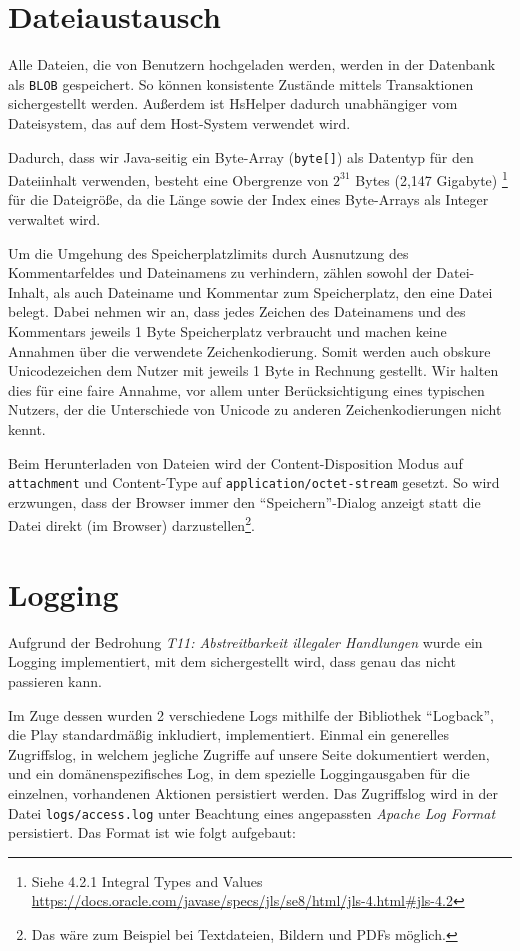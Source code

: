 \documentclass[12pt,DIV14,BCOR10mm,a4paper,parskip=half-,headsepline,headinclude,english,ngerman,bibliography=totocnumbered]{scrreprt}
\begin{document}
\section{Dateiaustausch}
Alle Dateien, die von Benutzern hochgeladen werden, werden in der Datenbank als \texttt{BLOB} gespeichert. So können konsistente Zustände mittels Transaktionen sichergestellt werden. Außerdem ist HsHelper dadurch unabhängiger vom Dateisystem, das auf dem Host-System verwendet wird.

Dadurch, dass wir Java-seitig ein Byte-Array (\texttt{byte[]}) als Datentyp für den Dateiinhalt verwenden, besteht eine Obergrenze von $2^{31}$ Bytes (2,147 Gigabyte) \footnote{Siehe 4.2.1 Integral Types and Values \url{https://docs.oracle.com/javase/specs/jls/se8/html/jls-4.html\#jls-4.2}} für die Dateigröße, da die Länge sowie der Index eines Byte-Arrays als Integer verwaltet wird.

Um die Umgehung des Speicherplatzlimits durch Ausnutzung des Kommentarfeldes und Dateinamens zu verhindern, zählen sowohl der Datei-Inhalt, als auch Dateiname und Kommentar zum Speicherplatz, den eine Datei belegt.
Dabei nehmen wir an, dass jedes Zeichen des Dateinamens und des Kommentars jeweils 1 Byte Speicherplatz verbraucht und machen keine Annahmen über die verwendete Zeichenkodierung.
Somit werden auch obskure Unicodezeichen dem Nutzer mit jeweils 1 Byte in Rechnung gestellt.
Wir halten dies für eine faire Annahme, vor allem unter Berücksichtigung eines typischen Nutzers, der die Unterschiede von Unicode zu anderen Zeichenkodierungen nicht kennt.

Beim Herunterladen von Dateien wird der Content-Disposition Modus auf \texttt{attachment} und Content-Type auf \texttt{application/octet-stream} gesetzt. So wird erzwungen, dass der Browser immer den \enquote{Speichern}-Dialog anzeigt statt die Datei direkt (im Browser) darzustellen\footnote{Das wäre zum Beispiel bei Textdateien, Bildern und PDFs möglich.}.

\section{Logging}

Aufgrund der Bedrohung \textit{T11: Abstreitbarkeit illegaler Handlungen} wurde ein Logging implementiert, mit dem sichergestellt wird, dass genau das nicht passieren kann.

Im Zuge dessen wurden 2 verschiedene Logs mithilfe der Bibliothek \enquote{Logback}, die Play standardmäßig inkludiert, implementiert.
Einmal ein generelles Zugriffslog, in welchem jegliche Zugriffe auf unsere Seite dokumentiert werden, und ein domänenspezifisches Log, in dem spezielle Loggingausgaben für die einzelnen, vorhandenen Aktionen persistiert werden.
Das Zugriffslog wird in der Datei \texttt{logs/access.log} unter Beachtung eines angepassten \textit{Apache Log Format} persistiert.
Das Format ist wie folgt aufgebaut:
\end{document}
